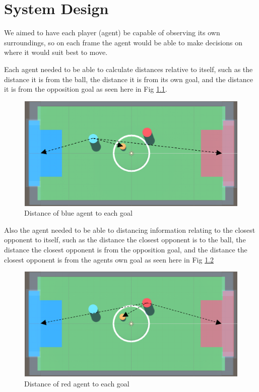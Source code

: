 
\chapter{System Design}
\begin{flushleft}
We aimed to have each player (agent) be capable of observing its own surroundings, so on each frame the agent would be able to make decisions on where it would suit best to move.\par
Each agent needed to be able to calculate distances relative to itself, such as the distance it is from the ball, the distance it is from its own goal, and the distance it is from the opposition goal as seen here in Fig \ref{fig:sd1}.
\end{flushleft}

\begin{figure}[H]
    \centering
    \includegraphics[width=115mm, height=55mm]{img/Image1.png}
    \caption{Distance of blue agent to each goal}
    \label{fig:sd1}
\end{figure}

\begin{flushleft}
Also the agent needed to be able to distancing information relating to the closest opponent to itself, such as the distance the closest opponent is to the ball, the distance the closest opponent is from the opposition goal, and the distance the closest opponent is from the agents own goal as seen here in Fig \ref{fig:sd2}
\end{flushleft}

\begin{figure}[H]
    \centering
    \includegraphics[width=115mm, height=55mm]{img/Image2.png}
    \caption{Distance of red agent to each goal}
    \label{fig:sd2}
\end{figure}

